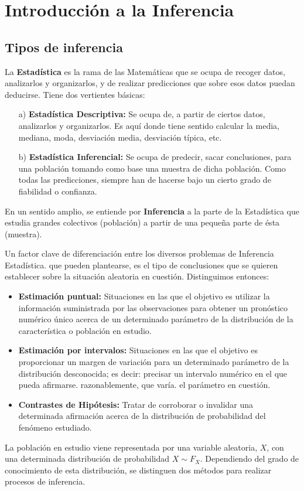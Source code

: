 \chapter{Introducción a la Inferencia}

\section{Tipos de inferencia}

La \textbf{Estadística} es la rama de las Matemáticas que se ocupa de recoger datos, analizarlos y organizarlos, y de realizar predicciones que sobre esos datos puedan deducirse. Tiene dos vertientes básicas:
\begin{enumerate}
    \item[a)] \textbf{Estadística Descriptiva:} Se ocupa de, a partir de ciertos datos, analizarlos y organizarlos. Es aquí donde tiene sentido calcular la media, mediana, moda, desviación media, desviación típica, etc.
    \item[b)] \textbf{Estadística Inferencial:} Se ocupa de predecir, sacar conclusiones, para una población tomando como base una muestra de dicha población. Como todas las predicciones, siempre han de hacerse bajo un cierto grado de fiabilidad o confianza.
\end{enumerate}
En un sentido amplio, se entiende por \textbf{Inferencia} a la parte de la Estadística que estudia grandes colectivos (población) a partir de una pequeña parte de ésta (muestra).

Un factor clave de diferenciación entre los diversos problemas de Inferencia Estadística. que pueden plantearse, es el tipo de conclusiones que se quieren establecer sobre la situación aleatoria en cuestión. Distinguimos entonces:

\begin{itemize}
    \item \textbf{Estimación puntual:} Situaciones en las que el objetivo es utilizar la información suministrada por las observaciones para obtener un pronóstico numérico único acerca de un determinado parámetro de la distribución de la característica o población en estudio.
    \item \textbf{Estimación por intervalos:} Situaciones en las que el objetivo es proporcionar un margen de variación para un determinado parámetro de la distribución desconocida; es decir: precisar un intervalo numérico en el que pueda afirmarse. razonablemente, que varía. el parámetro en cuestión.
    \item \textbf{Contrastes de Hipótesis:} Tratar de corroborar o invalidar una determinada afirmación acerca de la distribución de probabilidad del fenómeno estudiado.
\end{itemize}
La población en estudio viene representada por una variable aleatoria, $X$, con una determinada distribución de probabilidad $X \sim F_X$. Dependiendo del grado de conocimiento de esta distribución, se distinguen dos métodos para realizar procesos de inferencia.

